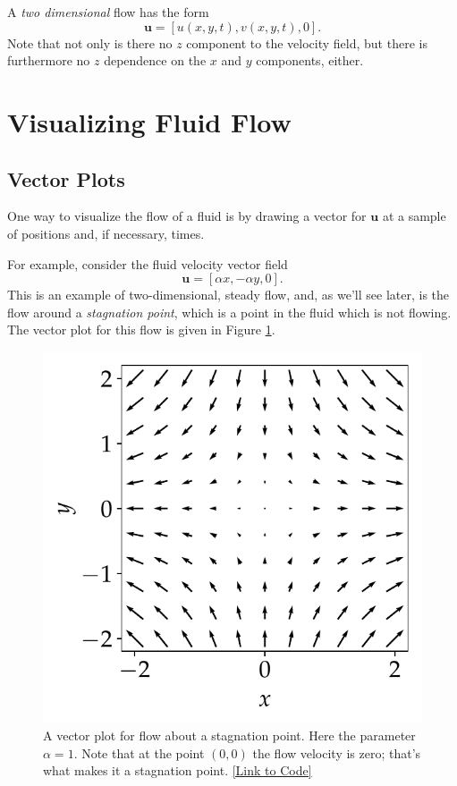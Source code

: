 \begin{example}
A \emph{two dimensional} flow has the form
\begin{equation}
\mathbf{u} = [u(x, y, t), v(x, y, t), 0].
\end{equation}
Note that not only is there no $z$ component to the velocity field, but there is furthermore no $z$ dependence on the
$x$ and $y$ components, either.
\end{example}





\section{Visualizing Fluid Flow}



\subsection{Vector Plots}

One way to visualize the flow of a fluid is by drawing a vector for $\mathbf{u}$ at a sample of positions and, if necessary, times.

\begin{example}
For example, consider the fluid velocity vector field
\begin{equation}
\label{eq_stag}
\mathbf{u} = [\alpha x, -\alpha y, 0].
\end{equation}
This is an example of two-dimensional, steady flow, and, as we'll see later, is the flow around a \emph{stagnation point}, which is a point in the fluid which is not flowing.  The vector plot for this flow is given in Figure \ref{fig_vector_plot}. 
\end{example}

\begin{figure}
\centering\includegraphics[width=0.5\linewidth]{Figures/Chapter1/fig_vector_plot}
\caption{A vector plot for flow about a stagnation point.  Here the parameter $\alpha = 1$.  Note that at the point $(0,0)$ the flow velocity is zero; that's what makes it a stagnation point. \href{https://nbviewer.jupyter.org/github/josephmacmillan/IntroFluidDynamics/blob/master/Jupyter/1%20-%20Introduction.ipynb#Figure-1.2:-A-vector-plot-for-flow-about-a-stagnation-point}{[Link to Code]}}
\label{fig_vector_plot}
\end{figure}



